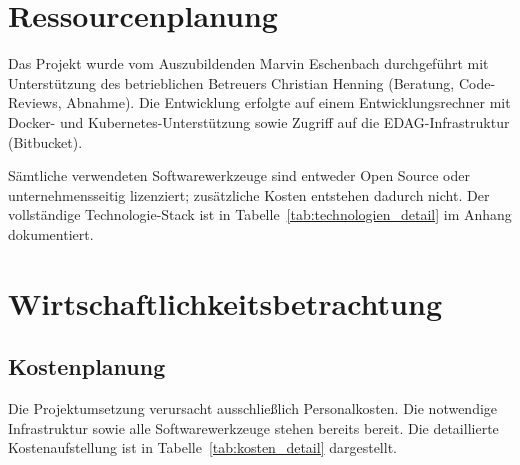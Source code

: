 \section{Ressourcenplanung}

Das Projekt wurde vom Auszubildenden Marvin Eschenbach durchgeführt mit Unterstützung des betrieblichen Betreuers Christian Henning (Beratung, Code-Reviews, Abnahme). Die Entwicklung erfolgte auf einem Entwicklungsrechner mit Docker- und Kubernetes-Unterstützung\cite{docker_docs,kubernetes_docs} sowie Zugriff auf die EDAG-Infrastruktur (Bitbucket\cite{bitbucket_docs}).

Sämtliche verwendeten Softwarewerkzeuge sind entweder Open Source oder unternehmensseitig lizenziert; zusätzliche Kosten entstehen dadurch nicht. Der vollständige Technologie-Stack ist in Tabelle~\ref{tab:technologien_detail} im Anhang dokumentiert.

\section{Wirtschaftlichkeitsbetrachtung}
\label{sec:wirtschaftlichkeit}

\subsection{Kostenplanung}

Die Projektumsetzung verursacht ausschließlich Personalkosten. Die notwendige Infrastruktur sowie alle Softwarewerkzeuge stehen bereits bereit. Die detaillierte Kostenaufstellung ist in Tabelle~\ref{tab:kosten_detail} dargestellt.


